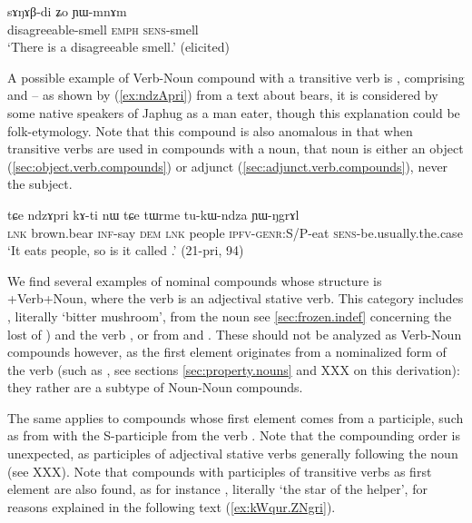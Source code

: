 \begin{exe}
\ex \label{ex:sANABdi}
\gll sɤŋɤβ-di ʑo ɲɯ-mnɤm \\
disagreeable-smell \textsc{emph} \textsc{sens}-smell \\
\glt `There is a disagreeable smell.' (elicited)
\end{exe}
A possible example of Verb-Noun compound with a transitive verb is , comprising  and  -- as shown by (\ref{ex:ndzApri}) from a text about bears, it is considered by some native speakers of Japhug as a man eater, though this explanation could be folk-etymology. Note that this compound is also anomalous in that when transitive verbs are used in compounds with a noun, that noun is either an object (\ref{sec:object.verb.compounds}) or adjunct (\ref{sec:adjunct.verb.compounds}), never the subject.

\begin{exe}
\ex \label{ex:ndzApri}
\gll tɕe ndzɤpri kɤ-ti nɯ tɕe tɯrme tu-kɯ-ndza ɲɯ-ŋgrɤl \\
\textsc{lnk} brown.bear \textsc{inf}-say \textsc{dem} \textsc{lnk} people \textsc{ipfv}-\textsc{genr}:S/P-eat \textsc{sens}-be.usually.the.case \\
\glt `It eats people, so is it called .' (21-pri, 94)
\end{exe} 

We find several examples of nominal compounds whose structure is +Verb+Noun, where the verb is an adjectival stative verb. This category includes , literally `bitter mushroom', from the noun  see \ref{sec:frozen.indef} concerning the lost of ) and the verb , or  from  and . These should not be analyzed as Verb-Noun compounds however, as the first element originates from a nominalized form of the verb (such as , see sections \ref{sec:property.nouns} and XXX on this derivation): they rather are a subtype of Noun-Noun compounds.

The same applies to compounds whose first element comes from a participle, such as  from  with the S-participle   from the verb . Note that the compounding order is unexpected, as participles of adjectival stative verbs generally following the noun (see XXX). Note that compounds with participles of transitive verbs as first element are also found, as for instance , literally `the star of the helper', for reasons explained in the following text (\ref{ex:kWqur.ZNgri}).

